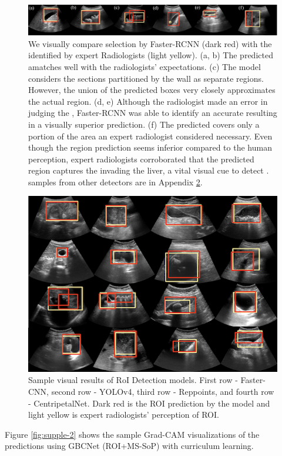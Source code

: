 %
\begin{figure}[t]
	\centering
	\includegraphics[width = \linewidth]{figs/roi_preds.jpg}%
	\caption[Comparison between the ROIs predicted by Faster-RCNN with radiologists]{We visually compare \roi selection by Faster-RCNN (dark red) with the \roi identified by expert Radiologists (light yellow). (a, b) The predicted a\roi matches well with the radiologists' expectations. (c) The model considers the sections partitioned by the \gb wall as separate regions. However, the union of the predicted boxes very closely approximates the actual \gb region. (d, e) Although the radiologist made an error in judging the \roi, Faster-RCNN was able to identify an accurate \roi resulting in a visually superior prediction. (f) The predicted \roi covers only a portion of the area an expert radiologist considered necessary. Even though the region prediction seems inferior compared to the human perception, expert radiologists corroborated that the predicted region captures the \gb invading the liver, a vital visual cue to detect \gbc. \roi samples from other detectors are in Appendix \cref{fig:supple-1}.}
	\label{fig:region_vis}
\end{figure}
%
\begin{figure}[t]
	\centering
	\includegraphics[width=0.7\linewidth]{figs/gbcnet/vis-s-0.png}
	\caption[Additional ROI visuals]{Sample visual results of RoI Detection models. First row - Faster-CNN, second row - YOLOv4, third row - Reppoints, and fourth row - CentripetalNet. Dark red is the ROI prediction by the model and light yellow is expert radiologists' perception of ROI.}
	\label{fig:supple-1}
\end{figure}
%
%
%
Figure \ref{fig:supple-2} shows the sample Grad-CAM visualizations of the predictions using GBCNet (ROI+MS-SoP) with curriculum learning. %

